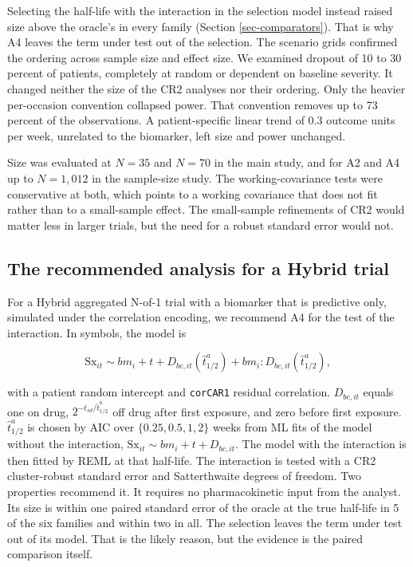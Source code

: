 \documentclass[
  11pt,
]{article}
\begin{document}
Selecting the half-life with the interaction in the selection model
instead raised size above the oracle's in every family (Section
\ref{sec-comparators}). That is why A4 leaves the term under test
out of the selection. The scenario grids confirmed the ordering across
sample size and effect size. We examined dropout of 10 to 30 percent
of patients, completely at random or dependent on baseline severity.
It changed neither the size of the CR2 analyses nor their ordering.
Only the heavier per-occasion convention collapsed power. That
convention removes up to 73 percent of the observations. A
patient-specific linear trend of 0.3 outcome units per week,
unrelated to the biomarker, left size and power unchanged.

Size was evaluated at \(N = 35\) and \(N = 70\) in the main study, and
for A2 and A4 up to \(N = 1{,}012\) in the sample-size study. The
working-covariance tests were conservative at both, which points to a
working covariance that does not fit rather than to a small-sample
effect. The small-sample refinements of CR2 would matter less in
larger trials, but the need for a robust standard error would not.

\subsection{The recommended analysis for a Hybrid trial}\label{sec-recommend}

For a Hybrid aggregated N-of-1 trial with a biomarker that is
predictive only, simulated under the correlation encoding, we
recommend A4 for the test of the interaction. In symbols, the model is

\[\text{Sx}_{it} \sim bm_i + t + D_{bc,it}(\hat t^{a}_{1/2}) +
  bm_i{:}D_{bc,it}(\hat t^{a}_{1/2}),\]

with a patient random intercept and \texttt{corCAR1} residual correlation.
\(D_{bc,it}\) equals one on drug, \(2^{-t_{sd}/\hat t^{a}_{1/2}}\) off
drug after first exposure, and zero before first exposure.
\(\hat t^{a}_{1/2}\) is chosen by AIC over \(\{0.25, 0.5, 1, 2\}\) weeks
from ML fits of the model without the interaction,
\(\text{Sx}_{it} \sim bm_i + t + D_{bc,it}\). The model with the
interaction is then fitted by REML at that half-life. The interaction
is tested with a CR2 cluster-robust standard error and Satterthwaite
degrees of freedom. Two properties recommend it. It requires no
pharmacokinetic input from the analyst. Its size is within one paired
standard error of the oracle at the true half-life in
5 of the six families and
within two in all.
The selection leaves the term under test out of its model. That is
the likely reason, but the evidence is the paired comparison itself.
\end{document}
